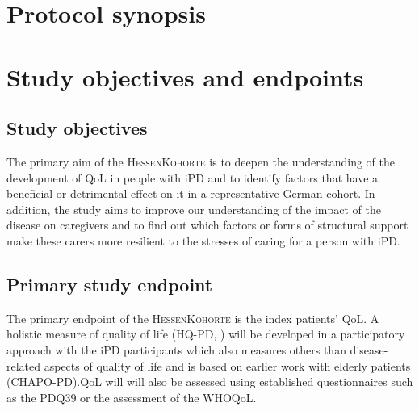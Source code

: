 
\section{Protocol synopsis}
\newpage


\section{Study objectives and endpoints}
\subsection{Study objectives}
The primary aim of the \textsc{HessenKohorte} is to deepen the understanding of the development of \ac{QoL} in people with \ac{iPD} and to identify factors that have a beneficial or detrimental effect on it in a representative German cohort. In addition, the study aims to improve our understanding of the impact of the disease on caregivers and to find out which factors or forms of structural support make these carers more resilient to the stresses of caring for a person with \ac{iPD}.

\subsection{Primary study endpoint}
The primary endpoint of the \textsc{HessenKohorte} is the index patients' \ac{QoL}. A holistic measure of quality of life (\acl{HQ-PD}, ) will be developed in a participatory approach with the \ac{iPD} participants which also measures others than disease-related aspects of quality of life and is based on earlier work with elderly patients (\acs{CHAPO-PD}).\ac{QoL} will will also be assessed using established questionnaires such as the \ac{PDQ39}\citep{jenkinson1997pdq39} or the assessment of the \ac{WHOQoL}\citep{group1998world}.

